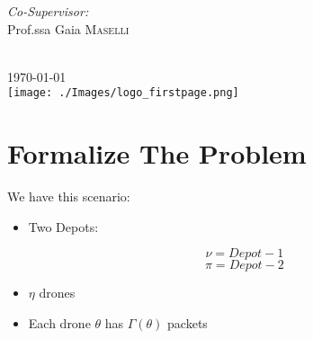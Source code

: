 \documentclass[12pt]{article}
\begin{document}
\begin{titlepage}
\begin{minipage}{0.4\textwidth}
\begin{flushright}
\emph{Co-Supervisor:} \\
Prof.ssa Gaia \textsc{Maselli} %

\end{flushright}
\end{minipage}\\[2cm]



{\large \today}\\[2cm] %


\texttt{[image: ./Images/logo\_firstpage.png]}\\[3cm] %
 

\vfill %


\end{titlepage}

\tableofcontents

\newpage

\section{Formalize The Problem}

We have this scenario:

\begin{itemize}

    \item Two Depots:
  
    \[
        \nu = Depot -1  
    \]
    \[
        \pi = Depot -2
    \]
    
    \item $\eta$ drones
    
    \item Each drone $\theta$ has $\Gamma(\theta)$ packets
    
\end{itemize}
\end{document}
